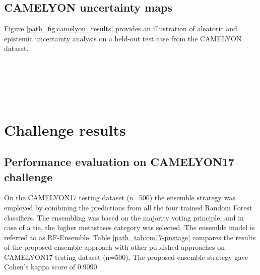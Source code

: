 \documentclass[times,twocolumn,final,authoryear]{tmp}
\begin{document}
\subsection{CAMELYON uncertainty maps}
Figure \ref{path_fig:camelyon_results} provides an illustration of aleatoric and epistemic uncertainty analysis on a held-out test case from the CAMELYON dataset.
\begin{figure*}
\centering
    \\
    \\
    \\
    \\
    \caption{In the figure for 1-5 (a) Whole slide image of H\&E stained lymph node section from CAMELYON dataset, (b) Pathologist annotation of tumour overlayed on whole slide image, (c) Tumour probability heatmaps overlayed on the whole slide image and, (d) Corresponding uncertainty analysis maps.}
    \label{path_fig:camelyon_results}
\end{figure*}

\section{Challenge results}
\label{path_sec:path_results}
\subsection{Performance evaluation on CAMELYON17 challenge}
On the CAMELYON17 testing dataset (n=500) the ensemble strategy was employed by combining the predictions from all the four trained Random Forest classifiers. The ensembling was based on the majority voting principle, and in case of a tie, the higher metastases category was selected. The ensemble model is referred to as RF-Ensemble. Table \ref{path_tab:cm17-pnstage} compares the results of the proposed ensemble approach with other published approaches on CAMELYON17 testing dataset (n=500). The proposed ensemble strategy gave Cohen's kappa score of 0.9090.
\end{document}
